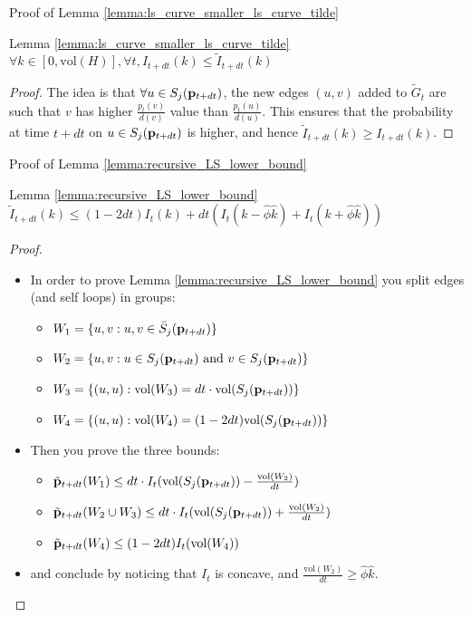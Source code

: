 \documentclass[../main.tex]{subfiles}
\begin{document}
	\begin{frame}{Proof of Lemma \ref{lemma:ls_curve_smaller_ls_curve_tilde}}
		\begin{block}{Lemma \ref{lemma:ls_curve_smaller_ls_curve_tilde}}
			$\forall k\in[0,\text{vol}(H)], \forall t, I_{t+dt}(k) \leq \tilde{I}_{t+dt}(k)$
		\end{block}
		\begin{proof}
			The idea is that $\forall u\in S_j(\bold{p}_{t+dt})$, the new edges $(u,v)$ added to $\tilde{G}_t$ are such that $v$ has higher $\frac{p_t(v)}{d(v)}$ value than $\frac{p_t(u)}{d(u)}$. This ensures that the probability at time $t+dt$ on $u\in S_j(\bold{p}_{t+dt})$ is higher, and hence $\tilde{I}_{t+dt}(k) \geq I_{t+dt}(k)$.
		\end{proof}
	\end{frame}

	\begin{frame}{Proof of Lemma \ref{lemma:recursive_LS_lower_bound}}
		\begin{block}{Lemma \ref{lemma:recursive_LS_lower_bound}}
			$\tilde{I}_{t+dt}(k)\leq (1-2dt)I_t(k) + dt(I_t(k-\hat{\phi}\hat{k}) + I_t(k+\hat{\phi}\hat{k}))$
		\end{block}
		\begin{proof}
			\begin{itemize}
				\item In order to prove Lemma \ref{lemma:recursive_LS_lower_bound} you split edges (and self loops) in groups:
				\begin{itemize}
					\item $W_1 = \{u,v: u,v\in \bar{S}_j(\bold{p}_{t+dt})\}$ 
					\item $W_2 = \{u,v: u\in S_j(\bold{p}_{t+dt}) \text{ and } v\in S_j(\bold{p}_{t+dt})\}$
					\item $W_3 = \{(u,u) : \text{vol}(W_3) = dt\cdot\text{vol}(S_j(\bold{p}_{t+dt}))\}$
					\item $W_4 = \{(u,u) : \text{vol}(W_4) = (1-2dt)\text{vol}(S_j(\bold{p}_{t+dt}))\}$
				\end{itemize}
				\item Then you prove the three bounds:
					\begin{itemize}
						\item $\tilde{\bold{p}}_{t+dt}(W_1) \leq dt \cdot I_t(\text{vol}(S_j(\bold{p}_{t+dt})) - \frac{\text{vol}(W_2)}{dt})$
						\item $\tilde{\bold{p}}_{t+dt}(W_2\cup W_3)\leq dt\cdot I_t(\text{vol}(S_j(\bold{p}_{t+dt})) + \frac{\text{vol}(W_2)}{dt})$
						\item $\tilde{\bold{p}}_{t+dt}(W_4) \leq (1-2dt) I_t(\text{vol}(W_4))$
					\end{itemize}
				\item and conclude by noticing that $I_t$ is concave, and $\frac{\text{vol}(W_2)}{dt} \geq \hat{\phi}\hat{k}$.
			\end{itemize}
		\end{proof}
	\end{frame}
\end{document}
